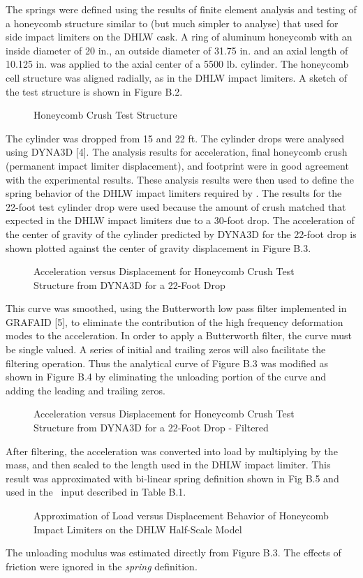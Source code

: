     The springs were defined using the results of finite element
analysis and testing of a honeycomb structure similar to
(but much simpler to analyse) that used for
side impact limiters on the DHLW cask.  A ring of aluminum honeycomb
with an inside diameter of 20 in., an outside diameter of 31.75 in. and
an axial length of 10.125 in. was applied to the axial center of a
5500 lb. cylinder. The honeycomb cell structure 
was aligned radially, as 
in the DHLW impact limiters.  A
sketch of the test structure is shown in Figure B.2. 
\begin{figure}
\vspace{3.5 in}
\caption{Honeycomb Crush Test Structure}
\end{figure}
The cylinder was
dropped from 15 and 22 ft.  The cylinder drops were analysed using
DYNA3D [4].  The analysis results for acceleration, final honeycomb
crush (permanent impact limiter displacement), and footprint were in
good agreement with the experimental results. These analysis results
were then used to define the spring behavior of the DHLW impact
limiters required by \SLAP .  The results for the 22-foot test 
cylinder drop were 
used because the amount of crush matched that expected in the 
DHLW impact limiters due to a 30-foot drop.
The acceleration of the
center of gravity of the cylinder predicted by DYNA3D for the 22-foot
drop is shown plotted against the center of gravity displacement in
Figure B.3.
\begin{figure}
\vspace{3.5 in}
\caption{Acceleration versus Displacement for Honeycomb Crush Test 
Structure from DYNA3D for a 22-Foot Drop}
\end{figure}
This curve was smoothed, using the Butterworth low pass
filter implemented in GRAFAID [5],
to eliminate the contribution of the high frequency deformation
modes to the acceleration.  In order to apply a Butterworth filter,
the curve must be single valued. 
A series of
initial and trailing zeros will also facilitate the filtering 
operation. 
Thus the analytical curve of Figure B.3
was modified as shown in Figure B.4 by eliminating the unloading 
portion of the curve and adding the leading and trailing zeros.
\begin{figure}
\vspace{3.5 in}
\caption{Acceleration versus Displacement for Honeycomb Crush Test 
Structure from DYNA3D for a 22-Foot Drop - Filtered}
\end{figure}
After filtering, the acceleration was converted into load
by multiplying by the mass, and then scaled to the length used in the
DHLW impact limiter. This result was approximated with bi-linear 
spring definition shown in Fig B.5 and used in the \SLAP\ input
described in Table B.1.
\begin{figure}
\vspace{3.5 in}
\caption{Approximation of Load versus Displacement Behavior of 
Honeycomb Impact Limiters on the DHLW Half-Scale Model}
\end{figure}
The unloading modulus was estimated directly
from Figure B.3. The effects of friction were ignored in the {\em
spring} definition. 


